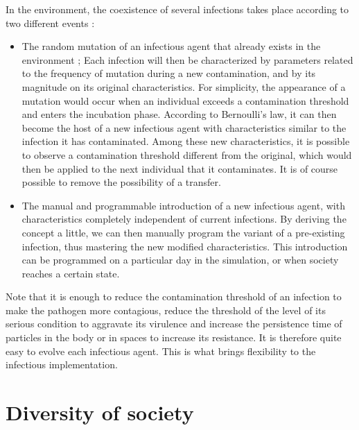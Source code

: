 In the environment, the coexistence of several infections takes place according to two different events :\\

\begin{itemize}
\item The random mutation of an infectious agent that already exists in the environment ; Each infection will then be characterized by parameters related to the frequency of mutation during a new contamination, and by its magnitude on its original characteristics. For simplicity, the appearance of a mutation would occur when an individual exceeds a contamination threshold and enters the incubation phase. According to Bernoulli's law, it can then become the host of a new infectious agent with characteristics similar to the infection it has contaminated. Among these new characteristics, it is possible to observe a contamination threshold different from the original, which would then be applied to the next individual that it contaminates. It is of course possible to remove the possibility of a transfer.
\item The manual and programmable introduction of a new infectious agent, with characteristics completely independent of current infections. By deriving the concept a little, we can then manually program the variant of a pre-existing infection, thus mastering the new modified characteristics. This introduction can be programmed on a particular day in the simulation, or when society reaches a certain state.\\
\end{itemize}

Note that it is enough to reduce the contamination threshold of an infection to make the pathogen more contagious, reduce the threshold of the level of its serious condition to aggravate its virulence and increase the persistence time of particles in the body or in spaces to increase its resistance. It is therefore quite easy to evolve each infectious agent. This is what brings flexibility to the infectious implementation.\\

\newpage

\section{Diversity of society}

